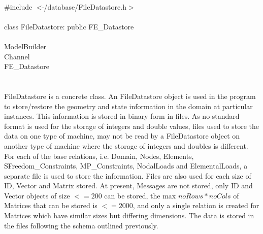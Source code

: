 
   \\
\indent \#include $<\tilde{ }$/database/FileDatastore.h$>$  \\

  \\
\indent class FileDatastore: public FE\_Datastore \\

 \\
\indent ModelBuilder \\
\indent Channel \\
\indent\indent FE\_Datastore \\
\indent\indent{} \\

  \\
\indent FileDatastore is a concrete class. An FileDatastore object is
used in the program to store/restore the geometry and state information 
in the domain at particular instances. This information is stored in
binary form in files. As no standard format is used for the storage of
integers and double values, files used to store the data on one type
of machine, may not be read by a FileDatastore object on another type
of machine where the storage of integers and doubles is different. \\

For each of the base relations, i.e. Domain, Nodes, Elements,
SFreedom\_Constraints, MP\_Constraints, NodalLoads and ElementalLoads, a
separate file is used to store the information. Files are also used
for each size of ID, Vector and Matrix stored. At present, Messages
are not stored, only ID and Vector objects of size $<= 200$ can be
stored, the max $noRows * noCols$ of Matrices that can be stored
is $<= 2000$, and only a single relation is created for Matrices which
have similar sizes but differing dimensions. The data is stored in the
files following the schema outlined previously.\\


